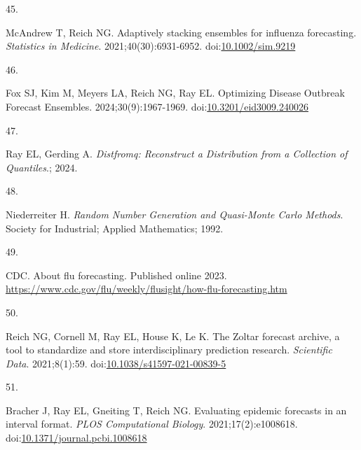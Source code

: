 \documentclass[
  letterpaper,
  DIV=11,
  numbers=noendperiod]{scrartcl}
\newlength{\cslhangindent}
\newlength{\csllabelwidth}
\newenvironment{CSLReferences}[2] %
 {\begin{list}{}{%
  \setlength{\itemindent}{0pt}
  \setlength{\leftmargin}{0pt}
  \setlength{\parsep}{0pt}
  \ifodd #1
   \setlength{\leftmargin}{\cslhangindent}
   \setlength{\itemindent}{-1\cslhangindent}
  \fi
  \setlength{\itemsep}{#2\baselineskip}}}
 {\end{list}}
\newcommand{\CSLLeftMargin}[1]{\parbox[t]{\csllabelwidth}{\strut#1\strut}}
\newcommand{\CSLRightInline}[1]{\parbox[t]{\linewidth - \csllabelwidth}{\strut#1\strut}}
\begin{document}
\begin{CSLReferences}{0}{1}
\CSLLeftMargin{45. }%
\CSLRightInline{McAndrew T, Reich NG. Adaptively stacking ensembles for
influenza forecasting. \emph{Statistics in Medicine}.
2021;40(30):6931-6952.
doi:\href{https://doi.org/10.1002/sim.9219}{10.1002/sim.9219}}

\CSLLeftMargin{46. }%
\CSLRightInline{Fox SJ, Kim M, Meyers LA, Reich NG, Ray EL. Optimizing
{Disease} {Outbreak} {Forecast} {Ensembles}. 2024;30(9):1967-1969.
doi:\href{https://doi.org/10.3201/eid3009.240026}{10.3201/eid3009.240026}}

\CSLLeftMargin{47. }%
\CSLRightInline{Ray EL, Gerding A. \emph{Distfromq: Reconstruct a
Distribution from a Collection of Quantiles}.; 2024.}

\CSLLeftMargin{48. }%
\CSLRightInline{Niederreiter H. \emph{Random Number Generation and
Quasi-Monte Carlo Methods}. Society for Industrial; Applied Mathematics;
1992.}

\CSLLeftMargin{49. }%
\CSLRightInline{CDC. About flu forecasting. Published online 2023.
\url{https://www.cdc.gov/flu/weekly/flusight/how-flu-forecasting.htm}}

\CSLLeftMargin{50. }%
\CSLRightInline{Reich NG, Cornell M, Ray EL, House K, Le K. The {Zoltar}
forecast archive, a tool to standardize and store interdisciplinary
prediction research. \emph{Scientific Data}. 2021;8(1):59.
doi:\href{https://doi.org/10.1038/s41597-021-00839-5}{10.1038/s41597-021-00839-5}}

\CSLLeftMargin{51. }%
\CSLRightInline{Bracher J, Ray EL, Gneiting T, Reich NG. Evaluating
epidemic forecasts in an interval format. \emph{PLOS Computational
Biology}. 2021;17(2):e1008618.
doi:\href{https://doi.org/10.1371/journal.pcbi.1008618}{10.1371/journal.pcbi.1008618}}

\end{CSLReferences}
\end{document}
